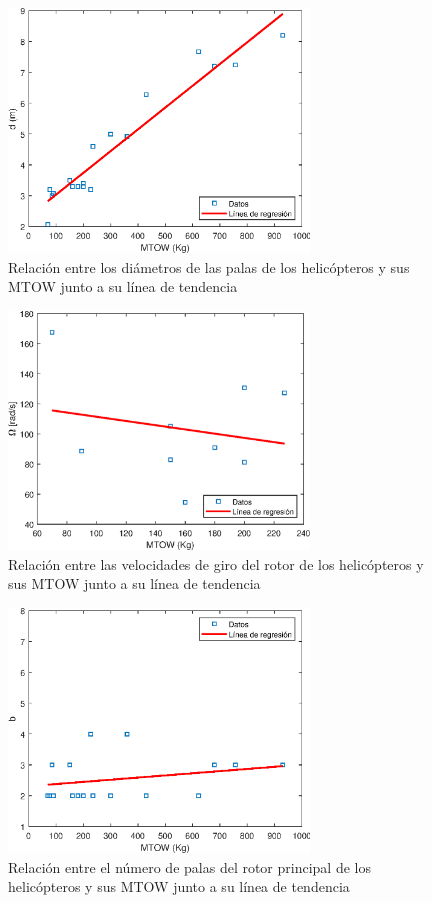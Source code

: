 \begin{figure}
	\centering
	\includegraphics[width=80mm]{graficos/anald}
	\caption{Relación entre los diámetros de las palas de los helicópteros y sus MTOW junto a su línea de tendencia}
\end{figure}
\begin{figure}
	\centering
	\includegraphics[width=80mm]{graficos/analomega}
	\caption{Relación entre las velocidades de giro del rotor de los helicópteros y sus MTOW junto a su línea de tendencia}
\end{figure}
\begin{figure}
	\centering
	\includegraphics[width=80mm]{graficos/analb}
	\caption{Relación entre el número de palas del rotor principal de los helicópteros y sus MTOW junto a su línea de tendencia}
\end{figure}
